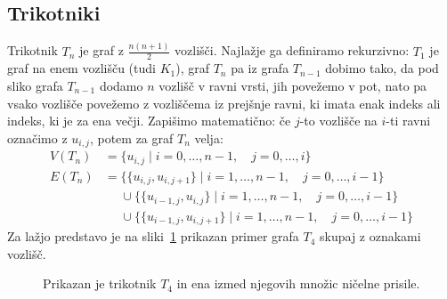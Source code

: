 \documentclass[12pt,a4paper,twoside]{article}
\theoremstyle{definition} %
\theoremstyle{plain} %
\numberwithin{equation}{section}  %
\begin{document}
\subsection{Trikotniki}
Trikotnik $T_n$ je graf z $\frac{n (n+1)}{2}$ vozlišči. Najlažje ga definiramo rekurzivno:
$T_1$ je graf na enem vozlišču (tudi $K_1$), graf $T_n$ pa iz grafa $T_{n-1}$ dobimo tako, da pod sliko grafa $T_{n-1}$ dodamo $n$ vozlišč v ravni vrsti, jih povežemo v pot, nato pa vsako vozlišče povežemo z vozliščema iz prejšnje ravni, ki imata enak indeks ali indeks, ki je za ena večji. Zapišimo matematično: če $j$-to vozlišče na $i$-ti ravni označimo z $u_{i,j}$, potem za graf $T_n$ velja: 
\begin{align*}
    V(T_n) &= \{u_{i,j} \mid i=0,\ldots,n-1, \quad j=0,\ldots,i \} \\
    E(T_n) &= \{ \{u_{i,j}, u_{i, j+1} \} \mid i=1,\ldots,n-1, \quad j=0,\ldots,i-1  \} 
    \\ &\phantom{=} \cup \{ \{ u_{i-1, j}, u_{i,j}  \} \mid i=1,\ldots,n-1, \quad j=0,\ldots,i-1  \} 
    \\ &\phantom{=} \cup \{ \{ u_{i-1, j},u_{i,j+1} \} \mid i=1,\ldots,n-1, \quad j=0,\ldots,i-1  \} 
\end{align*}
Za lažjo predstavo je na sliki~\ref{fig:trikotnik} prikazan primer grafa $T_4$ skupaj z oznakami vozlišč.
\begin{figure}[h]
    \centering
    \caption{Prikazan je trikotnik $T_4$ in ena izmed njegovih množic ničelne prisile.}
    \label{fig:trikotnik}
\end{figure}
\end{document}
